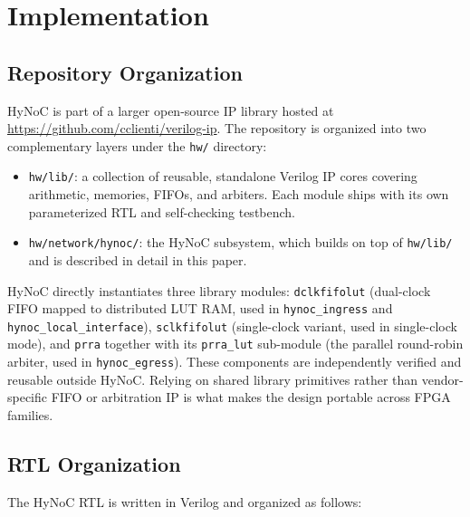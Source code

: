 \section{Implementation}
\label{sec:implementation}

\subsection{Repository Organization}

HyNoC is part of a larger open-source IP library hosted at
\url{https://github.com/cclienti/verilog-ip}. The repository is organized into
two complementary layers under the \texttt{hw/} directory:

\begin{itemize}
  \item \texttt{hw/lib/}: a collection of reusable, standalone Verilog IP cores
        covering arithmetic, memories, FIFOs, and arbiters. Each module ships
        with its own parameterized RTL and self-checking testbench.
  \item \texttt{hw/network/hynoc/}: the HyNoC subsystem, which builds on top of
        \texttt{hw/lib/} and is described in detail in this paper.
\end{itemize}

HyNoC directly instantiates three library modules:
\texttt{dclkfifolut} (dual-clock FIFO mapped to distributed LUT RAM, used in
\texttt{hynoc\_ingress} and \texttt{hynoc\_local\_interface}),
\texttt{sclkfifolut} (single-clock variant, used in single-clock mode), and
\texttt{prra} together with its \texttt{prra\_lut} sub-module (the parallel
round-robin arbiter, used in \texttt{hynoc\_egress}).
These components are independently verified and reusable outside HyNoC.
Relying on shared library primitives rather than vendor-specific FIFO or
arbitration IP is what makes the design portable across FPGA families.

\subsection{RTL Organization}

The HyNoC RTL is written in Verilog and organized as follows:

